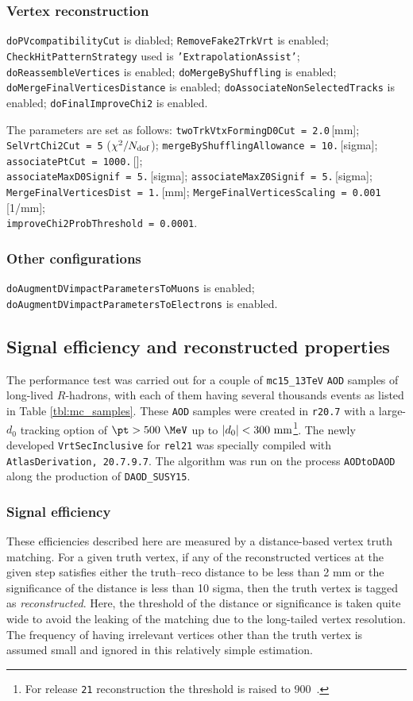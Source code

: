 \documentclass[NOTE, atlasdraft=true, texlive=2018, UKenglish]{\ATLASLATEXPATH atlasdoc}
\begin{document}
\subsubsection{Vertex reconstruction}
{\tt doPVcompatibilityCut} is diabled; {\tt RemoveFake2TrkVrt} is enabled; {\tt CheckHitPatternStrategy} used is {\tt 'ExtrapolationAssist'}; {\tt doReassembleVertices} is enabled; {\tt doMergeByShuffling} is enabled; {\tt doMergeFinalVerticesDistance} is enabled; {\tt doAssociateNonSelectedTracks} is enabled; {\tt doFinalImproveChi2} is enabled.

The parameters are set as follows: {\tt twoTrkVtxFormingD0Cut = 2.0}\,[mm];\\
{\tt SelVrtChi2Cut = 5} ($\chi^{2}/N_{\rm dof}$); {\tt mergeByShufflingAllowance = 10.}\,[sigma];\\
{\tt associatePtCut = 1000.}\,[\MeV];\\
{\tt associateMaxD0Signif = 5.}\,[sigma]; {\tt associateMaxZ0Signif = 5.}\,[sigma];\\
{\tt MergeFinalVerticesDist = 1.}\,[mm]; {\tt MergeFinalVerticesScaling = 0.001}\,[1/mm];\\ {\tt improveChi2ProbThreshold = 0.0001}.

\subsubsection{Other configurations}
{\tt doAugmentDVimpactParametersToMuons} is enabled; {\tt doAugmentDVimpactParametersToElectrons} is enabled.

\subsection{Signal efficiency and reconstructed properties}
The performance test was carried out for a couple of {\tt mc15\_13TeV} {\tt AOD} samples of long-lived $R$-hadrons, with each of them having several thousands events as listed in Table \ref{tbl:mc_samples}. These {\tt AOD} samples were created in {\tt r20.7} with a large-$d_{0}$ tracking option of $\pt>500~\MeV$ up to $|d_{0}|<300~{\rm mm}$\footnote{For release {\tt 21} reconstruction the \pt threshold is raised to 900~\MeV.}. The newly developed {\tt VrtSecInclusive} for {\tt rel21} was specially compiled with {\tt AtlasDerivation, 20.7.9.7}. The algorithm was run on the process {\tt AODtoDAOD} along the production of {\tt DAOD\_SUSY15}.

\subsubsection{Signal efficiency}
These efficiencies described here are measured by a distance-based vertex truth matching. For a given truth vertex, if any of the reconstructed vertices at the given step satisfies either the truth--reco distance to be less than 2 mm or the significance of the distance is less than 10 sigma, then the truth vertex is tagged as \emph{reconstructed}. Here, the threshold of the distance or significance is taken quite wide to avoid the leaking of the matching due to the long-tailed vertex resolution. The frequency of having irrelevant vertices other than the truth vertex is assumed small and ignored in this relatively simple estimation.
\end{document}
